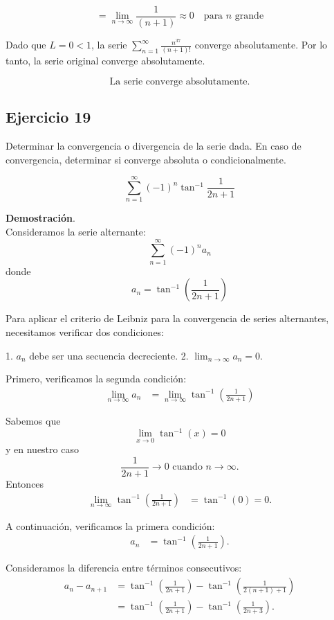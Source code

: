 \documentclass{article}
\begin{document}
    \[
    = \lim\limits_{n \to \infty} \frac{1}{(n+1)} \approx 0 \quad \text{para $n$ grande}
    \]

    Dado que $L = 0 < 1$, la serie $\sum_{n=1}^{\infty} \frac{n^{37}}{(n+1)!}$ converge absolutamente. Por lo tanto, la serie original converge absolutamente.

    \[
    \text{La serie converge absolutamente.}
    \]



    \subsection*{Ejercicio 19}

    Determinar la convergencia o divergencia de la serie dada. En caso de convergencia, determinar si converge absoluta o condicionalmente.

    $$
    \sum_{n=1}^{\infty}(-1)^{n} \tan^{-1} \frac{1}{2n+1}
    $$

    \textbf{Demostración}.\\

    Consideramos la serie alternante:
    $$
    \sum_{n=1}^{\infty}(-1)^{n}a_{n}
    $$
    donde
    $$
    a_{n} = \tan^{-1}\left(\frac{1}{2n+1}\right)
    $$

    Para aplicar el criterio de Leibniz para la convergencia de series alternantes, necesitamos verificar dos condiciones:

    1. \( a_{n} \) debe ser una secuencia decreciente.
    2. \( \lim_{n \to \infty} a_{n} = 0 \).

    Primero, verificamos la segunda condición:
    \begin{align*}
    \lim_{n \to \infty} a_{n} &= \lim_{n \to \infty} \tan^{-1}\left(\frac{1}{2n+1}\right)
    \end{align*}

    Sabemos que
    $$
    \lim_{x \to 0} \tan^{-1}(x) = 0
    $$
    y en nuestro caso
    $$
    \frac{1}{2n+1} \to 0 \text{ cuando } n \to \infty.
    $$
    Entonces
    \begin{align*}
    \lim_{n \to \infty} \tan^{-1}\left(\frac{1}{2n+1}\right) &= \tan^{-1}(0) = 0.
    \end{align*}

    A continuación, verificamos la primera condición:
    \begin{align*}
    a_{n} &= \tan^{-1} \left(\frac{1}{2n+1}\right).
    \end{align*}

    Consideramos la diferencia entre términos consecutivos:
    \begin{align*}
    a_{n} - a_{n+1} &= \tan^{-1} \left(\frac{1}{2n+1}\right) - \tan^{-1} \left(\frac{1}{2(n+1)+1}\right) \\
    &= \tan^{-1} \left(\frac{1}{2n+1}\right) - \tan^{-1} \left(\frac{1}{2n+3}\right).
    \end{align*}
\end{document}
